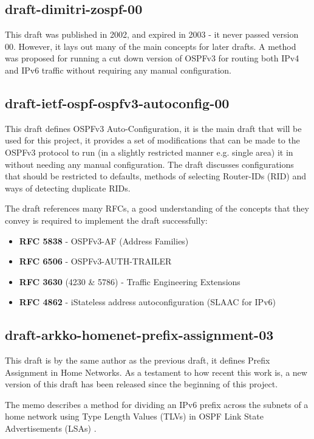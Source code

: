 \documentclass[12pt]{report}
\begin{document}
\subsection{draft-dimitri-zospf-00}
This draft was published in 2002, and expired in 2003 - it never passed version
00.  However, it lays out many of the main concepts for later drafts. A method
was proposed for running a cut down version of OSPFv3 for routing both IPv4 and
IPv6 traffic without requiring any manual configuration. 

\subsection{draft-ietf-ospf-ospfv3-autoconfig-00} 
This draft defines OSPFv3 Auto-Configuration, it is the main draft that will be
used for this project, it provides a set of modifications that can be made to
the OSPFv3 protocol to run (in a slightly restricted manner e.g. single area)
it in without needing any manual configuration. The draft discusses
configurations that should be restricted to defaults, methods of selecting
Router-IDs (RID)  and ways of detecting duplicate RIDs. 

The draft references many RFCs, a good understanding of the concepts 
that they convey is required to implement the draft successfully:

\begin{itemize}
	\item {\bf RFC 5838} - OSPFv3-AF (Address Families)
	\item {\bf RFC 6506} - OSPFv3-AUTH-TRAILER
	\item {\bf RFC 3630} (4230 \& 5786) - Traffic Engineering Extensions 
	\item {\bf RFC 4862} - iStateless address autoconfiguration (SLAAC for IPv6) 
\end{itemize}

\subsection{draft-arkko-homenet-prefix-assignment-03}
This draft is by the same author as the previous draft, it defines
Prefix Assignment in Home Networks. As a testament to how recent this work is, a
new version of this draft has been released since the beginning of this project. 

The memo describes a method for dividing an IPv6 prefix across the subnets of a
home network using Type Length Values (TLVs)   in OSPF Link State Advertisements (LSAs) .
\end{document}
